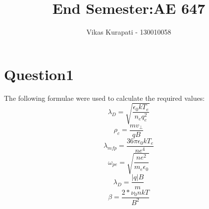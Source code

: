 \documentclass[11pt, a4paper]{article}
\title{\textbf{End Semester:AE 647}}
\author{Vikas Kurapati - 130010058}
\begin{document}
\maketitle
\newpage
\section{Question1}
The following formulae were used to calculate the required values:
\begin{equation}
 \lambda_D = \sqrt{\frac{\epsilon_0 kT_e}{n_eq_e^2}}
\end{equation}
\begin{equation}
 \rho_c = \frac{mv_\bot}{qB}
\end{equation}
\begin{equation}
 \lambda_{mfp} = \frac{36\pi \epsilon_0 kT_e}{ne^4}
\end{equation}
\begin{equation}
 \omega_{pe} = \sqrt{\frac{ne^2}{m_e \epsilon_0}}
\end{equation}
\begin{equation}
 \lambda_D = \frac{|q| B}{m}
\end{equation}
\begin{equation}
 \beta = \frac{2*\nu_0 nkT}{B^2}
\end{equation}
\end{document}
